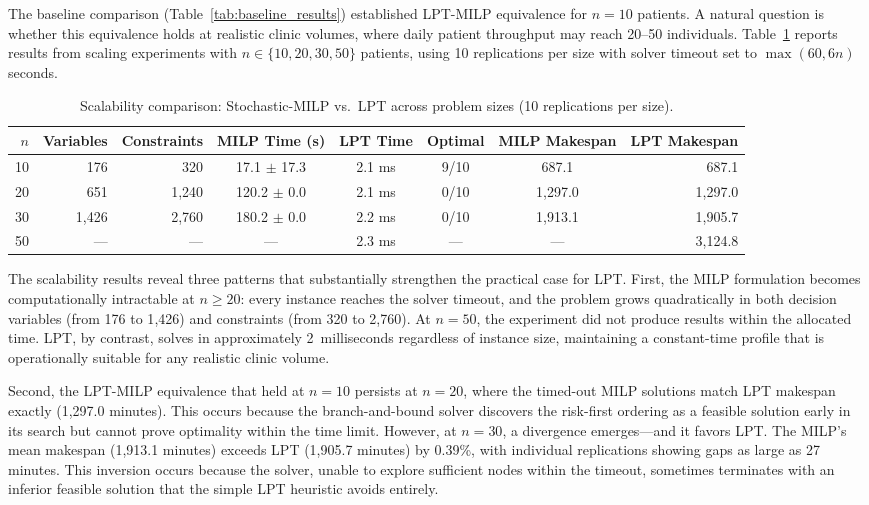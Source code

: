 \documentclass[11pt,a4paper]{article}
\begin{document}
The baseline comparison (Table~\ref{tab:baseline_results}) established LPT-MILP equivalence for $n = 10$ patients. A natural question is whether this equivalence holds at realistic clinic volumes, where daily patient throughput may reach 20--50 individuals. Table~\ref{tab:scalability} reports results from scaling experiments with $n \in \{10, 20, 30, 50\}$ patients, using 10 replications per size with solver timeout set to $\max(60, 6n)$ seconds.
\begin{table}[H]
\centering
\caption{Scalability comparison: Stochastic-MILP vs.\ LPT across problem sizes (10 replications per size).}
\label{tab:scalability}
\begin{tabular}{@{}rrrccccr@{}}
\toprule
$n$ & Variables & Constraints & MILP Time (s) & LPT Time & Optimal & MILP Makespan & LPT Makespan \\
\midrule
10 & 176 & 320 & 17.1 $\pm$ 17.3 & 2.1 ms & 9/10 & 687.1 & 687.1 \\
20 & 651 & 1{,}240 & 120.2 $\pm$ 0.0 & 2.1 ms & 0/10 & 1{,}297.0 & 1{,}297.0 \\
30 & 1{,}426 & 2{,}760 & 180.2 $\pm$ 0.0 & 2.2 ms & 0/10 & 1{,}913.1 & 1{,}905.7 \\
50 & --- & --- & --- & 2.3 ms & --- & --- & 3{,}124.8 \\
\bottomrule
\end{tabular}
\end{table}

The scalability results reveal three patterns that substantially strengthen the practical case for LPT. First, the MILP formulation becomes computationally intractable at $n \geq 20$: every instance reaches the solver timeout, and the problem grows quadratically in both decision variables (from 176 to 1{,}426) and constraints (from 320 to 2{,}760). At $n = 50$, the experiment did not produce results within the allocated time. LPT, by contrast, solves in approximately 2~milliseconds regardless of instance size, maintaining a constant-time profile that is operationally suitable for any realistic clinic volume.

Second, the LPT-MILP equivalence that held at $n = 10$ persists at $n = 20$, where the timed-out MILP solutions match LPT makespan exactly (1{,}297.0 minutes). This occurs because the branch-and-bound solver discovers the risk-first ordering as a feasible solution early in its search but cannot prove optimality within the time limit. However, at $n = 30$, a divergence emerges---and it favors LPT. The MILP's mean makespan (1{,}913.1 minutes) exceeds LPT (1{,}905.7 minutes) by 0.39\%, with individual replications showing gaps as large as 27 minutes. This inversion occurs because the solver, unable to explore sufficient nodes within the timeout, sometimes terminates with an inferior feasible solution that the simple LPT heuristic avoids entirely.
\end{document}
